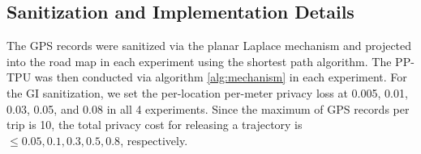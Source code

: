 \documentclass[10pt,journal,compsoc]{IEEEtran}
\begin{document}
\vspace{-9pt}\subsection{Sanitization and Implementation Details}\vspace{-3pt}
The GPS records were sanitized via the  planar Laplace mechanism and projected into the road map in each experiment using the shortest path algorithm. The PP-TPU was then conducted via algorithm \ref{alg:mechanism} in each experiment. For the GI sanitization, we set the per-location per-meter privacy loss at 0.005, 0.01, 0.03, 0.05, and 0.08 in all 4 experiments. Since the maximum of GPS records per trip is 10, the total privacy cost for releasing a trajectory is $\le 0.05, 0.1, 0.3, 0.5, 0.8$, respectively.   
\end{document}
